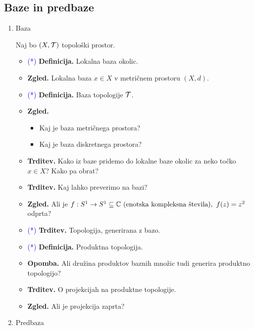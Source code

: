 \subsection{Baze in predbaze}
\begin{enumerate}
    \item Baza
    
    Naj bo \((X, \mathcal{T})\) topološki prostor.
    \begin{itemize}
        \item \textcolor{blue}{(*)} \textbf{Definicija.} Lokalna baza okolic.
        \item \textbf{Zgled.} Lokalna baza \(x \in X\) v metričnem prostoru \((X, d)\).
        \item \textcolor{blue}{(*)} \textbf{Definicija.} Baza topologije \(\mathcal{T}\).
        \item \textbf{Zgled.} \ 
        \begin{itemize}
            \item Kaj je baza metričnega prostora?
            \item Kaj je baza diskretnega prostora?
        \end{itemize}
        \newpage
        \item \textbf{Trditev.} Kako iz baze pridemo do lokalne baze okolic za neko točko \(x \in X\)? Kako pa obrat?
        \item \textbf{Trditev.} Kaj lahko preverimo na bazi?
        \item \textbf{Zgled.} Ali je $f: S^1 \to S^1 \subseteq \mathbb{C} \text{ (enotska kompleksna števila)}, \ f(z) = z^2$ odprta?
        \item \textcolor{blue}{(*)} \textbf{Trditev.} Topologija, generirana z bazo.
        \item  \textcolor{blue}{(*)} \textbf{Definicija.} Produktna topologija.
        \item \textbf{Opomba.} Ali družina produktov baznih množic tudi generira produktno topologijo?
        \item \textbf{Trditev.} O projekcijah na produktne topologije.
        \item \textbf{Zgled.} Ali je projekcija zaprta? 
    \end{itemize}

    \item Predbaza
    

\end{enumerate}
